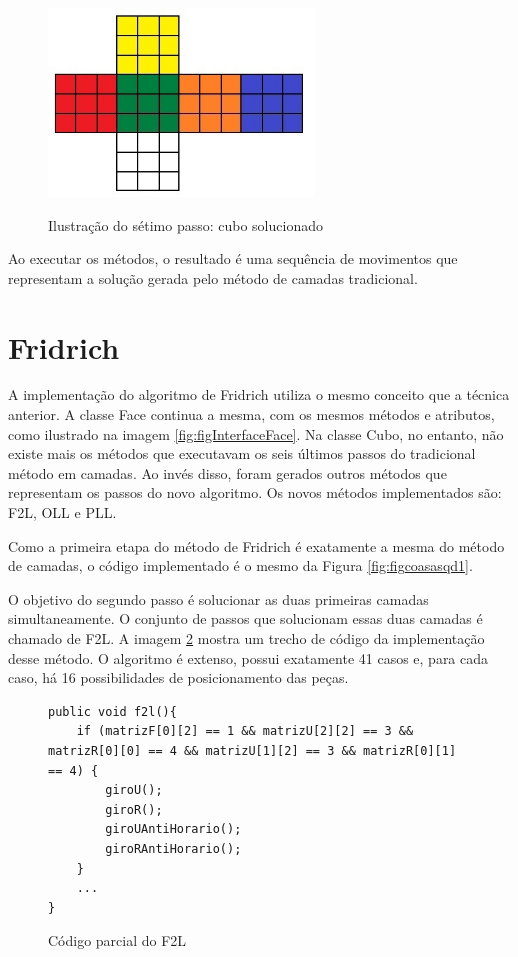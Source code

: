 \begin{figure}[!htb]
    \centering
    {
        \includegraphics[height=5cm]{imagens/setimopasso.jpg}
        \label{figFront}
    }
    
\caption{Ilustração do sétimo passo: cubo solucionado}
\label{fig:setimopassox}
\end{figure}

Ao executar os métodos, o resultado é uma sequência de movimentos que representam a solução gerada pelo método de camadas tradicional.


\section{Fridrich}



A implementação do algoritmo de Fridrich utiliza o mesmo conceito que a técnica anterior. A classe Face continua a mesma, com os mesmos métodos e atributos, como ilustrado na imagem \ref{fig:figInterfaceFace}. Na classe Cubo, no entanto, não existe mais os métodos que executavam os seis últimos passos do tradicional método em camadas. Ao invés disso, foram gerados outros métodos que representam os passos do novo algoritmo. Os novos métodos implementados são: F2L, OLL e PLL. 


Como a primeira etapa do método de Fridrich é exatamente a mesma do método de camadas, o código implementado é o mesmo da Figura \ref{fig:figcoasasqd1}.  

O objetivo do segundo passo é solucionar as duas primeiras camadas simultaneamente. O conjunto de passos que solucionam essas duas camadas é chamado de F2L. A imagem \ref{fig:fridrich2} mostra um trecho de código da implementação desse método. O algoritmo é extenso, possui exatamente 41 casos e, para cada caso, há 16 possibilidades de posicionamento das peças. 


\begin{figure}[!htb]
\begin{lstlisting}
public void f2l(){
    if (matrizF[0][2] == 1 && matrizU[2][2] == 3 && matrizR[0][0] == 4 && matrizU[1][2] == 3 && matrizR[0][1] == 4) {
        giroU();
        giroR();
        giroUAntiHorario();
        giroRAntiHorario();
    }
    ...
}
\end{lstlisting}
\caption{Código parcial do F2L}
\label{fig:fridrich2}
\end{figure}


